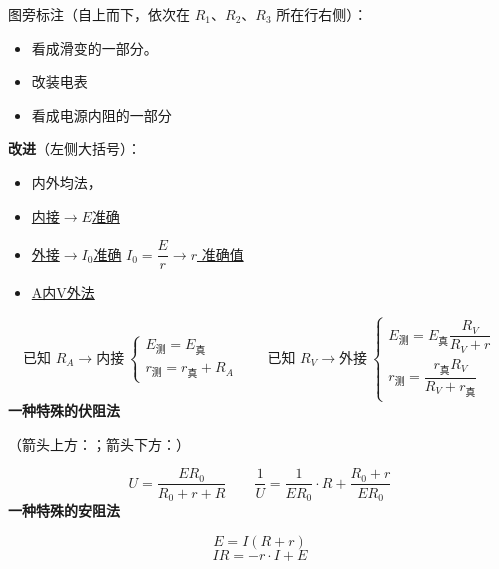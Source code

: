 图旁标注（自上而下，依次在 $R_1$、$R_2$、$R_3$ 所在行右侧）：
\begin{itemize}
\item 看成滑变的一部分。
\item 改装电表
\item 看成电源内阻的一部分
\end{itemize}
\textbf{改进}（左侧大括号）：
\begin{itemize}
\item 内外均法，
\item \underline{内接$\to E$准确} %
\item \underline{外接$\to I_0$准确} \quad \underline{$I_0=\dfrac{E}{r}\to r$ 准确值} %
\item \underline{A内V外法} %
\end{itemize}
\[
\text{已知 }R_A\to\text{内接}\
\left\{\begin{array}{l} E_{\text{测}}=E_{\text{真}}\\ r_{\text{测}}=r_{\text{真}}+R_A \end{array}\right.
\qquad
\text{已知 }R_V\to\text{外接}\
\left\{\begin{array}{l} E_{\text{测}}=E_{\text{真}}\dfrac{R_V}{R_V+r}\\[8pt] r_{\text{测}}=\dfrac{r_{\text{真}}R_V}{R_V+r_{\text{真}}} \end{array}\right.
\]
\textbf{一种特殊的伏阻法}


（箭头上方：；箭头下方：）

\[
U=\frac{E R_0}{R_0+r+R}
\qquad
\frac{1}{U}=\frac{1}{ER_0}\cdot R+\frac{R_0+r}{ER_0}
\]
\textbf{一种特殊的安阻法}



\[ E=I(R+r) \]
\[ IR=-r\cdot I+E \]
